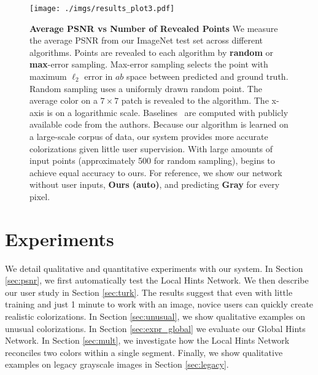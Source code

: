 \documentclass[acmtog,authorversion]{acmart}
\begin{document}
 
\begin{figure}[t!]
\texttt{[image: ./imgs/results\_plot3.pdf]}
\vspace{-6mm}
\caption{\textbf{Average PSNR vs Number of Revealed Points} We measure the average PSNR from our ImageNet test set across different algorithms. Points are revealed to each algorithm by \textbf{random} or \textbf{max}-error sampling. Max-error sampling selects the point with maximum $\ell_2$ error in $ab$ space between predicted and ground truth. Random sampling uses a uniformly drawn random point. The average color on a $7\times 7$ patch is revealed to the algorithm. The x-axis is on a logarithmic scale. Baselines~\cite{levin2004colorization,poole2016fast,endo2016deepprop} are computed with publicly available code from the authors. Because our algorithm is learned on a large-scale corpus of data, our system provides more accurate colorizations given little user supervision. With large amounts of input points (approximately 500 for random sampling), \cite{levin2004colorization} begins to achieve equal accuracy to ours. For reference, we show our network without user inputs, \textbf{Ours (auto)}, and predicting \textbf{Gray} for every pixel.}
\label{fig:psnr-points}
\vspace{-2mm}
\end{figure}

\section{Experiments}
\label{sec:expr}

We detail qualitative and quantitative experiments with our system. In Section \ref{sec:psnr}, we first automatically test the Local Hints Network.
We then describe our user study in Section \ref{sec:turk}. The results suggest that even with little training and just 1 minute to work with an image, novice users can quickly create realistic colorizations. In Section \ref{sec:unusual}, we show qualitative examples on unusual colorizations. In Section \ref{sec:expr_global} we evaluate our Global Hints Network. In Section \ref{sec:mult}, we investigate how the Local Hints Network reconciles two colors within a single segment. Finally, we show qualitative examples on legacy grayscale images in Section \ref{sec:legacy}.
\end{document}
